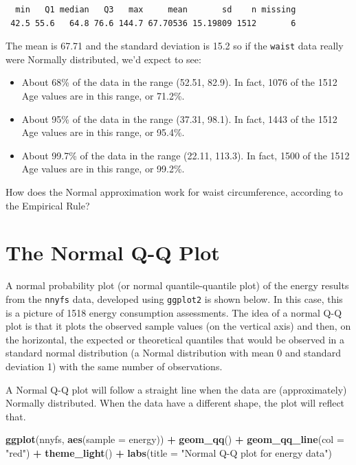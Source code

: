 \documentclass[
]{book}
\newenvironment{Shaded}{\begin{snugshade}}{\end{snugshade}}
\newcommand{\DataTypeTok}[1]{\textcolor[rgb]{0.13,0.29,0.53}{#1}}
\newcommand{\KeywordTok}[1]{\textcolor[rgb]{0.13,0.29,0.53}{\textbf{#1}}}
\newcommand{\NormalTok}[1]{#1}
\newcommand{\OperatorTok}[1]{\textcolor[rgb]{0.81,0.36,0.00}{\textbf{#1}}}
\newcommand{\StringTok}[1]{\textcolor[rgb]{0.31,0.60,0.02}{#1}}
\begin{document}
\begin{verbatim}
  min   Q1 median   Q3   max     mean       sd    n missing
 42.5 55.6   64.8 76.6 144.7 67.70536 15.19809 1512       6
\end{verbatim}

The mean is 67.71 and the standard deviation is 15.2 so if the \texttt{waist} data really were Normally distributed, we'd expect to see:

\begin{itemize}
\item
  About 68\% of the data in the range (52.51, 82.9). In fact, 1076 of the 1512 Age values are in this range, or 71.2\%.
\item
  About 95\% of the data in the range (37.31, 98.1). In fact, 1443 of the 1512 Age values are in this range, or 95.4\%.
\item
  About 99.7\% of the data in the range (22.11, 113.3). In fact, 1500 of the 1512 Age values are in this range, or 99.2\%.
\end{itemize}

How does the Normal approximation work for waist circumference, according to the Empirical Rule?

\hypertarget{the-normal-q-q-plot}{%
\section{The Normal Q-Q Plot}\label{the-normal-q-q-plot}}

A normal probability plot (or normal quantile-quantile plot) of the energy results from the \texttt{nnyfs} data, developed using \texttt{ggplot2} is shown below. In this case, this is a picture of 1518 energy consumption assessments. The idea of a normal Q-Q plot is that it plots the observed sample values (on the vertical axis) and then, on the horizontal, the expected or theoretical quantiles that would be observed in a standard normal distribution (a Normal distribution with mean 0 and standard deviation 1) with the same number of observations.

A Normal Q-Q plot will follow a straight line when the data are (approximately) Normally distributed. When the data have a different shape, the plot will reflect that.

\begin{Shaded}
\begin{Highlighting}[]
\KeywordTok{ggplot}\NormalTok{(nnyfs, }\KeywordTok{aes}\NormalTok{(}\DataTypeTok{sample =}\NormalTok{ energy)) }\OperatorTok{+}
\StringTok{    }\KeywordTok{geom_qq}\NormalTok{() }\OperatorTok{+}\StringTok{ }\KeywordTok{geom_qq_line}\NormalTok{(}\DataTypeTok{col =} \StringTok{"red"}\NormalTok{) }\OperatorTok{+}
\StringTok{    }\KeywordTok{theme_light}\NormalTok{() }\OperatorTok{+}
\StringTok{    }\KeywordTok{labs}\NormalTok{(}\DataTypeTok{title =} \StringTok{"Normal Q-Q plot for energy data"}\NormalTok{)}
\end{Highlighting}
\end{Shaded}
\end{document}
